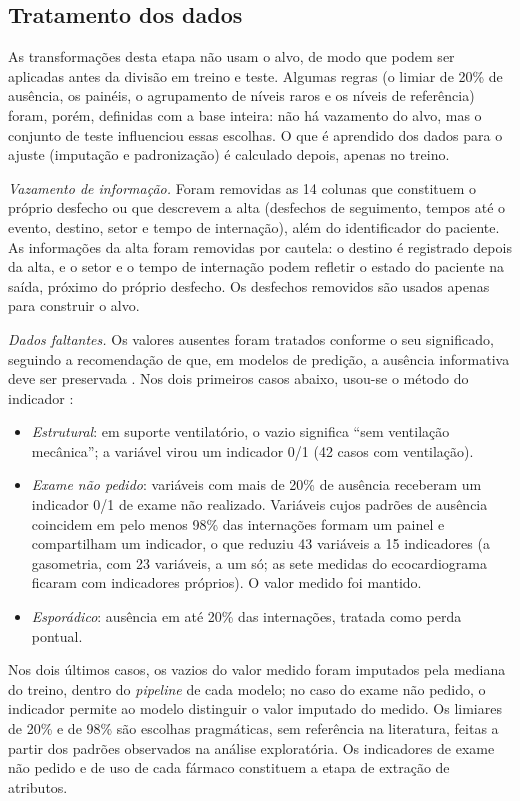 \documentclass[conference]{IEEEtran}
\begin{document}
\subsection{Tratamento dos dados}

As transformações desta etapa não usam o alvo, de modo que podem ser aplicadas antes da divisão em treino e teste. Algumas regras (o limiar de 20\% de ausência, os painéis, o agrupamento de níveis raros e os níveis de referência) foram, porém, definidas com a base inteira: não há vazamento do alvo, mas o conjunto de teste influenciou essas escolhas. O que é aprendido dos dados para o ajuste (imputação e padronização) é calculado depois, apenas no treino.

\textit{Vazamento de informação.} Foram removidas as 14 colunas que constituem o próprio desfecho ou que descrevem a alta (desfechos de seguimento, tempos até o evento, destino, setor e tempo de internação), além do identificador do paciente. As informações da alta foram removidas por cautela: o destino é registrado depois da alta, e o setor e o tempo de internação podem refletir o estado do paciente na saída, próximo do próprio desfecho. Os desfechos removidos são usados apenas para construir o alvo.

\textit{Dados faltantes.} Os valores ausentes foram tratados conforme o seu significado, seguindo a recomendação de que, em modelos de predição, a ausência informativa deve ser preservada \cite{b11}. Nos dois primeiros casos abaixo, usou-se o método do indicador \cite{b10}:
\begin{itemize}
\item \textit{Estrutural}: em suporte ventilatório, o vazio significa ``sem ventilação mecânica''; a variável virou um indicador 0/1 (42 casos com ventilação).
\item \textit{Exame não pedido}: variáveis com mais de 20\% de ausência receberam um indicador 0/1 de exame não realizado. Variáveis cujos padrões de ausência coincidem em pelo menos 98\% das internações formam um painel e compartilham um indicador, o que reduziu 43 variáveis a 15 indicadores (a gasometria, com 23 variáveis, a um só; as sete medidas do ecocardiograma ficaram com indicadores próprios). O valor medido foi mantido.
\item \textit{Esporádico}: ausência em até 20\% das internações, tratada como perda pontual.
\end{itemize}
Nos dois últimos casos, os vazios do valor medido foram imputados pela mediana do treino, dentro do \textit{pipeline} de cada modelo; no caso do exame não pedido, o indicador permite ao modelo distinguir o valor imputado do medido. Os limiares de 20\% e de 98\% são escolhas pragmáticas, sem referência na literatura, feitas a partir dos padrões observados na análise exploratória. Os indicadores de exame não pedido e de uso de cada fármaco constituem a etapa de extração de atributos.
\end{document}
